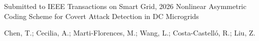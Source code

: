 \cventry
  {Submitted to IEEE Transactions on Smart Grid, 2026}
  {Nonlinear Asymmetric Coding Scheme for Covert Attack Detection in DC Microgrids}
  {}
  {}
  {
    \begin{cvitems}
      \item {Chen, T.; Cecilia, A.; Marti-Florences, M.; Wang, L.; Costa-Castell\'o, R.; Liu, Z.}
    \end{cvitems}
  }
